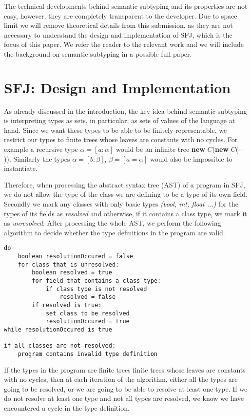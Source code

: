 \documentclass[runningheads]{llncs}
\begin{document}
The technical developments behind semantic subtyping and its properties are not easy, however, they are completely transparent to the developer.
Due to space limit we will remove theoretical details from this submission, as they are not necessary to understand the design and implementation of SFJ, which is the focus of this paper. We refer the reader to the relevant work \cite{Dardha2013,Dardha2017} and we will include the background on semantic subtyping in a possible full paper.


\section{SFJ: Design and Implementation}
\label{sec:design}
As already discussed in the introduction, the key idea behind semantic subtyping is interpreting types as sets, in particular,  as sets of values of the language at hand. Since we want these types to be able to be finitely representable, we restrict our types to finite trees whose leaves are constants with no cycles. 
For example a recursive type $\alpha = [a : \alpha]$ would be an infinite tree \textbf{new} $C$(\textbf{new} $C$($\cdots{}$)). 
Similarly the types $\alpha = [b: \beta]$, $\beta = [a = \alpha]$ would also be impossible to instantiate.

Therefore, when processing the abstract syntax tree (AST) of a program in SFJ, we do not allow the type of the class we are defining to be a type of its own field. 
Secondly we mark any classes with only basic types \emph{(bool, int, float ...)} for the types of its fields as \emph{resolved} and otherwise, if it contains a class type, we mark it as \emph{unresolved}. 
After processing the whole AST, we perform the following algorithm to decide whether the type definitions in the program are valid.
\begin{verbatim}
do
    boolean resolutionOccured = false
    for class that is unresolved:
        boolean resolved = true
        for field that contains a class type:
            if class type is not resolved
                resolved = false
        if resolved is true:
            set class to be resolved
            resolutionOccured = true
while resolutionOccured is true

if all classes are not resolved:
    program contains invalid type definition
\end{verbatim}

If the types in the program are finite trees finite trees whose leaves are constants with no cycles, then at each iteration of the algorithm, either all the types are going to be resolved, or we are going to be able to resolve at least one type. 
If we do not resolve at least one type and not all types are resolved, we know we have encountered a cycle in the type definition. 
\end{document}
